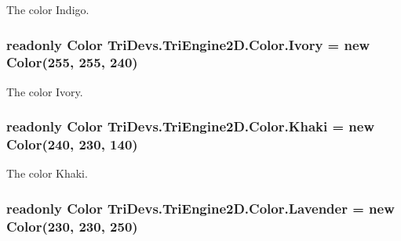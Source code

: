 The color Indigo. 

\hypertarget{struct_tri_devs_1_1_tri_engine2_d_1_1_color_a8df91dfe5df57c6a53f1e78776220b51}{
\subsubsection[{Ivory}]{\setlength{\rightskip}{0pt plus 5cm}readonly {\bf Color} Tri\-Devs.\-Tri\-Engine2\-D.\-Color.\-Ivory = new {\bf Color}(255, 255, 240)\hspace{0.3cm}{\ttfamily [static]}}}\label{struct_tri_devs_1_1_tri_engine2_d_1_1_color_a8df91dfe5df57c6a53f1e78776220b51}


The color Ivory. 

\hypertarget{struct_tri_devs_1_1_tri_engine2_d_1_1_color_a9720a3adfdfa22b17562ec5a6693b7b1}{
\subsubsection[{Khaki}]{\setlength{\rightskip}{0pt plus 5cm}readonly {\bf Color} Tri\-Devs.\-Tri\-Engine2\-D.\-Color.\-Khaki = new {\bf Color}(240, 230, 140)\hspace{0.3cm}{\ttfamily [static]}}}\label{struct_tri_devs_1_1_tri_engine2_d_1_1_color_a9720a3adfdfa22b17562ec5a6693b7b1}


The color Khaki. 

\hypertarget{struct_tri_devs_1_1_tri_engine2_d_1_1_color_ac945af6ee35194b137448fa868afca4d}{
\subsubsection[{Lavender}]{\setlength{\rightskip}{0pt plus 5cm}readonly {\bf Color} Tri\-Devs.\-Tri\-Engine2\-D.\-Color.\-Lavender = new {\bf Color}(230, 230, 250)\hspace{0.3cm}{\ttfamily [static]}}}\label{struct_tri_devs_1_1_tri_engine2_d_1_1_color_ac945af6ee35194b137448fa868afca4d}


